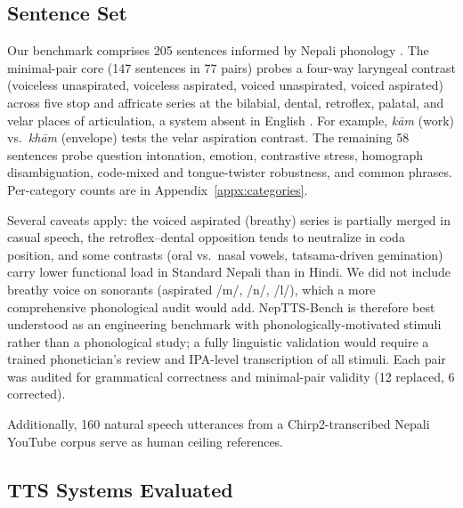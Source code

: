 \documentclass[11pt]{article}
\begin{document}
\subsection{Sentence Set}

Our benchmark comprises 205 sentences informed by Nepali phonology \citep{khatiwada2009, pokharel1989, bandhu1971}. The minimal-pair core (147 sentences in 77 pairs) probes a four-way laryngeal contrast (voiceless unaspirated, voiceless aspirated, voiced unaspirated, voiced aspirated) across five stop and affricate series at the bilabial, dental, retroflex, palatal, and velar places of articulation, a system absent in English \citep{khatiwada2009, pokharel1989}. For example, \textit{k\=am} (work) vs.\ \textit{kh\=am} (envelope) tests the velar aspiration contrast. The remaining 58 sentences probe question intonation, emotion, contrastive stress, homograph disambiguation, code-mixed and tongue-twister robustness, and common phrases. Per-category counts are in Appendix~\ref{appx:categories}.

Several caveats apply: the voiced aspirated (breathy) series is partially merged in casual speech, the retroflex--dental opposition tends to neutralize in coda position, and some contrasts (oral vs.\ nasal vowels, tatsama-driven gemination) carry lower functional load in Standard Nepali than in Hindi. We did not include breathy voice on sonorants (aspirated /m/, /n/, /l/), which a more comprehensive phonological audit would add. NepTTS-Bench is therefore best understood as an engineering benchmark with phonologically-motivated stimuli rather than a phonological study; a fully linguistic validation would require a trained phonetician's review and IPA-level transcription of all stimuli. Each pair was audited for grammatical correctness and minimal-pair validity (12 replaced, 6 corrected).

Additionally, 160 natural speech utterances from a Chirp2-transcribed Nepali YouTube corpus serve as human ceiling references.

\subsection{TTS Systems Evaluated}
\end{document}
